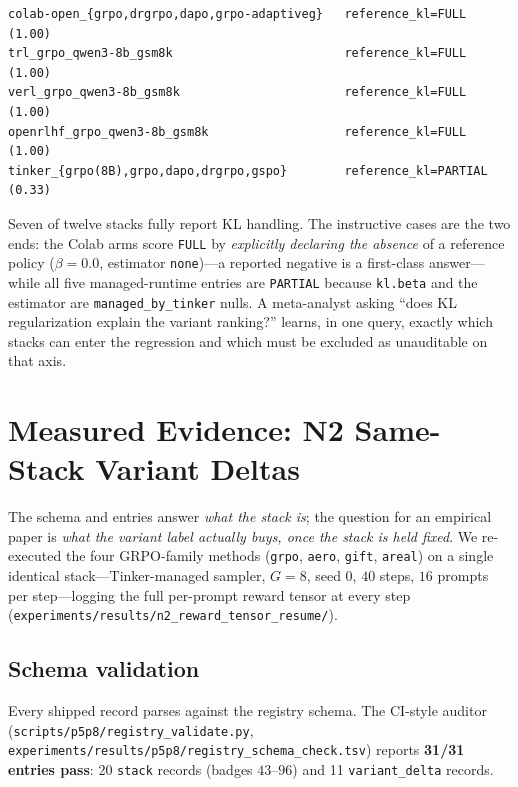 \documentclass{article}
\begin{document}
\begin{lstlisting}[basicstyle=\ttfamily\scriptsize, frame=single,
  caption={\texttt{query --item reference_kl} on the seed entries
  (grouped).}, label={lst:p6-klquery}]
colab-open_{grpo,drgrpo,dapo,grpo-adaptiveg}   reference_kl=FULL (1.00)
trl_grpo_qwen3-8b_gsm8k                        reference_kl=FULL (1.00)
verl_grpo_qwen3-8b_gsm8k                       reference_kl=FULL (1.00)
openrlhf_grpo_qwen3-8b_gsm8k                   reference_kl=FULL (1.00)
tinker_{grpo(8B),grpo,dapo,drgrpo,gspo}        reference_kl=PARTIAL (0.33)
\end{lstlisting}

Seven of twelve stacks fully report KL handling. The instructive cases are the
two ends: the Colab arms score \texttt{FULL} by \emph{explicitly declaring the
absence} of a reference policy ($\beta{=}0.0$, estimator \texttt{none})---a
reported negative is a first-class answer---while all five managed-runtime
entries are \texttt{PARTIAL} because \texttt{kl.beta} and the estimator are
\texttt{managed_by_tinker} nulls. A meta-analyst asking ``does KL
regularization explain the variant ranking?'' learns, in one query, exactly
which stacks can enter the regression and which must be excluded as
unauditable on that axis.
 \section{Measured Evidence: N2 Same-Stack Variant Deltas}
\label{sec:p6-measured}

The schema and entries answer \emph{what the stack is}; the question for an
empirical paper is \emph{what the variant label actually buys, once the
stack is held fixed}. We re-executed the four GRPO-family methods
(\texttt{grpo}, \texttt{aero}, \texttt{gift}, \texttt{areal}) on a single
identical stack---Tinker-managed sampler, $G{=}8$, seed $0$, $40$ steps,
$16$ prompts per step---logging the full per-prompt reward tensor at every
step (\texttt{experiments/results/n2\_reward\_tensor\_resume/}).

\subsection{Schema validation}
Every shipped record parses against the registry schema. The CI-style
auditor (\texttt{scripts/p5p8/registry\_validate.py},
\texttt{experiments/results/p5p8/registry\_schema\_check.tsv}) reports
\textbf{31/31 entries pass}: 20 \texttt{stack} records (badges $43$--$96$)
and 11 \texttt{variant\_delta} records.
\end{document}
